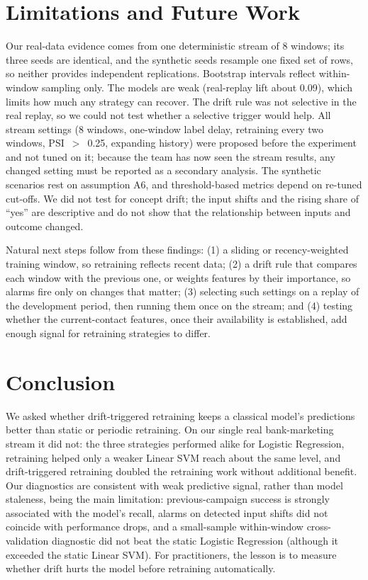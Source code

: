 \documentclass[conference]{IEEEtran}
\begin{document}
\section{Limitations and Future Work}

Our real-data evidence comes from one deterministic stream of 8 windows; its three seeds are identical, and the synthetic seeds resample one fixed set of rows, so neither provides independent replications. Bootstrap intervals reflect within-window sampling only. The models are weak (real-replay lift about 0.09), which limits how much any strategy can recover. The drift rule was not selective in the real replay, so we could not test whether a selective trigger would help. All stream settings (8 windows, one-window label delay, retraining every two windows, PSI~$>$~0.25, expanding history) were proposed before the experiment and not tuned on it; because the team has now seen the stream results, any changed setting must be reported as a secondary analysis. The synthetic scenarios rest on assumption A6, and threshold-based metrics depend on re-tuned cut-offs. We did not test for concept drift; the input shifts and the rising share of ``yes'' are descriptive and do not show that the relationship between inputs and outcome changed.

Natural next steps follow from these findings: (1) a sliding or recency-weighted training window, so retraining reflects recent data; (2) a drift rule that compares each window with the previous one, or weights features by their importance, so alarms fire only on changes that matter; (3) selecting such settings on a replay of the development period, then running them once on the stream; and (4) testing whether the current-contact features, once their availability is established, add enough signal for retraining strategies to differ.

\section{Conclusion}

We asked whether drift-triggered retraining keeps a classical model's predictions better than static or periodic retraining. On our single real bank-marketing stream it did not: the three strategies performed alike for Logistic Regression, retraining helped only a weaker Linear SVM reach about the same level, and drift-triggered retraining doubled the retraining work without additional benefit. Our diagnostics are consistent with weak predictive signal, rather than model staleness, being the main limitation: previous-campaign success is strongly associated with the model's recall, alarms on detected input shifts did not coincide with performance drops, and a small-sample within-window cross-validation diagnostic did not beat the static Logistic Regression (although it exceeded the static Linear SVM). For practitioners, the lesson is to measure whether drift hurts the model before retraining automatically.
\end{document}
